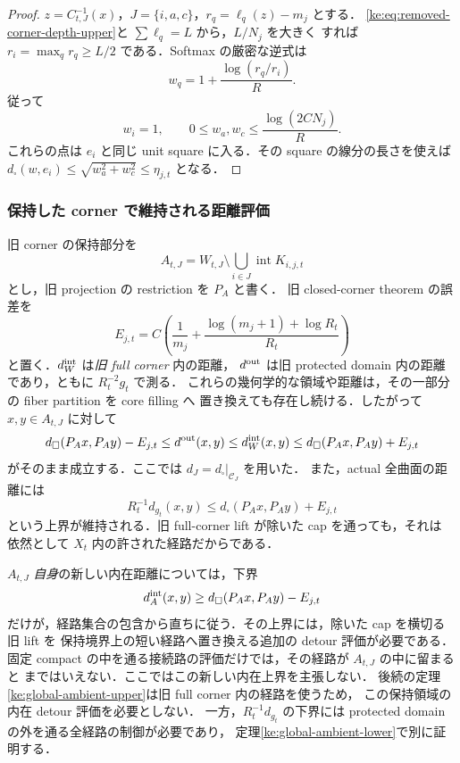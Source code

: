 \begin{proof}
$z=C_{t,J}^{-1}(x)$，$J=\{i,a,c\}$，$r_q=\ell_q(z)-m_j$ とする．
\eqref{ke:eq:removed-corner-depth-upper}と $\sum\ell_q=L$ から，$L/N_j$ を大きく
すれば $r_i=\max_qr_q\ge L/2$ である．Softmax の厳密な逆式は
\[
 w_q=1+\frac{\log(r_q/r_i)}R .
\]
従って
\[
 w_i=1,\qquad
 0\le w_a,w_c\le\frac{\log(2C N_j)}R .
\]
これらの点は $e_i$ と同じ unit square に入る．その square の線分の長さを使えば
$d_\square(w,e_i)\le\sqrt{w_a^2+w_c^2}\le\eta_{j,t}$ となる．
\end{proof}

\subsubsection{保持した corner で維持される距離評価}

旧 corner の保持部分を
\[
 A_{t,J}=W_{t,J}\setminus\bigcup_{i\in J}\operatorname{int}K_{i,j,t}
\]
とし，旧 projection の restriction を $P_A$ と書く．
旧 closed-corner theorem の誤差を
\[
 E_{j,t}=C\left(\frac1{m_j}
       +\frac{\log(m_j+1)+\log R_t}{R_t}\right)
\]
と置く．$d_W^{\rm int}$ は\emph{旧 full corner} 内の距離，
$d^{\rm out}$ は旧 protected domain 内の距離であり，ともに $R_t^{-2}g_t$ で測る．
これらの幾何学的な領域や距離は，その一部分の fiber partition を core filling へ
置き換えても存在し続ける．したがって $x,y\in A_{t,J}$ に対して
\begin{equation}\label{ke:eq:retained-protected-estimates}
 d_\square(P_Ax,P_Ay)-E_{j,t}
 \le d^{\rm out}(x,y)
 \le d_W^{\rm int}(x,y)
 \le d_\square(P_Ax,P_Ay)+E_{j,t}
\end{equation}
がそのまま成立する．ここでは $d_J=d_\square|_{\mathcal C_J}$ を用いた．
また，actual 全曲面の距離には
\[
 R_t^{-1}d_{g_t}(x,y)
 \le d_\square(P_Ax,P_Ay)+E_{j,t}
\]
という上界が維持される．旧 full-corner lift が除いた cap を通っても，それは
依然として $X_t$ 内の許された経路だからである．

$A_{t,J}$ \emph{自身}の新しい内在距離については，下界
\[
 d_A^{\rm int}(x,y)\ge d_\square(P_Ax,P_Ay)-E_{j,t}
\]
だけが，経路集合の包含から直ちに従う．その上界には，除いた cap を横切る旧 lift を
保持境界上の短い経路へ置き換える追加の detour 評価が必要である．
固定 compact の中を通る接続路の評価だけでは，その経路が $A_{t,J}$ の中に留まると
まではいえない．ここではこの新しい内在上界を主張しない．
後続の定理\ref{ke:global-ambient-upper}は旧 full corner 内の経路を使うため，
この保持領域の内在 detour 評価を必要としない．
一方，$R_t^{-1}d_{g_t}$ の下界には protected domain の外を通る全経路の制御が必要であり，
定理\ref{ke:global-ambient-lower}で別に証明する．

